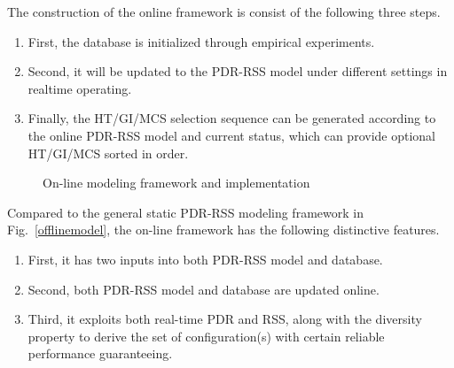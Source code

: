 \documentclass[draftclsnofoot,conference,onecolumn,11pt]{IEEEtran}
\begin{document}
The construction of the online framework is consist of the following three steps. 
\begin{enumerate}
  \item First, the database is initialized through empirical experiments. 
  \item Second, it will be updated to the PDR-RSS model under different settings in realtime operating. 
  \item Finally, the HT/GI/MCS selection sequence can be generated according to the online PDR-RSS model and current status, which can provide optional HT/GI/MCS sorted in order.
\end{enumerate}

\begin{figure}[!htp]
\centerline{
}
\caption{On-line modeling framework and implementation}
\label{implamentation}
\end{figure}

Compared to the general static PDR-RSS modeling framework in Fig.~\ref{offlinemodel}, the on-line framework has the following distinctive features. 
\begin{enumerate}
  \item First, it has two inputs into both PDR-RSS model and database.
  \item Second, both PDR-RSS model and database are updated online.
  \item Third, it exploits both real-time PDR and RSS, along with the diversity property to derive the set of configuration(s) with certain reliable performance guaranteeing.
\end{enumerate}
\end{document}
